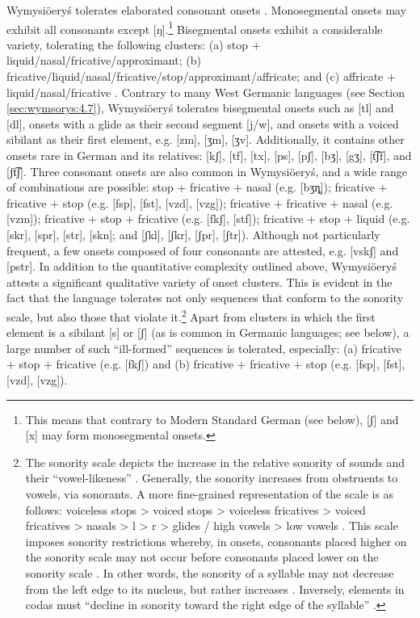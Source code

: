 \documentclass[output=paper,hidelinks]{langscibook}
\begin{document}
Wymysiöeryś tolerates elaborated consonant onsets \citep[71]{andrason_vilamovicean_2015}. Mono\-segmental onsets may exhibit all consonants except [ŋ].\footnote{This means that contrary to Modern Standard German (see below), [ʃ] and [x] may form monosegmental onsets.} Bisegmental onsets exhibit a considerable variety, tolerating the following clusters: (a) stop + liquid/na\-sal/fricative/approximant; (b) fricative/liquid/nasal/fricative/stop{\slash}approximant{\slash}affricate; and (c) affricate + liquid/nasal/fricative \citep{Andrason2021}. Contrary to many West Germanic languages (see Section \ref{sec:wymsorys:4.7}), Wymysiöeryś tolerates bisegmental onsets such as [tl] and [dl], onsets with a glide as their second segment [j/w], and onsets with a voiced sibilant as their first element, e.g. [zm], [ʒm], [ʒv]. Additionally, it contains other onsets rare in German and its relatives: [kʃ], [tf], [tx], [ps], [pʃ], [bʒ], [gʒ], [t͡ʃf], and [ʃt͡ʃ]. Three consonant onsets are also common in Wymysiöeryś, and a wide range of combinations are possible: stop + fricative + nasal (e.g. [bʒȵ]); fricative + fricative + stop (e.g. [fsp], [fst], [vzd], [vzg]); fricative + fricative + nasal (e.g. [vzm]); fricative + stop + fricative (e.g. [fkʃ], [stf]); fricative + stop + liquid (e.g. [skr], [spr], [str], [skn]; and [ʃkl], [ʃkr], [ʃpr], [ʃtr]). Although not particularly frequent, a few onsets composed of four consonants are attested, e.g. [vskʃ] and [pstr]. In addition to the quantitative complexity outlined above, Wymysiöeryś attests a significant qualitative variety of onset clusters. This is evident in the fact that the language tolerates not only sequences that conform to the sonority scale, but also those that violate it.\footnote{The sonority scale depicts the increase in the relative sonority of sounds and their ``vowel-likeness'' \citep{foley_foundations_1977, clements_role_1990}. Generally, the sonority increases from obstruents to vowels, via sonorants. A more fine-grained representation of the scale is as follows: voiceless stops > voiced stops > voiceless fricatives > voiced fricatives > nasals > l > r > glides / high vowels > low vowels \citep[65]{harbert_germanic_2007}. This scale imposes sonority restrictions whereby, in onsets, consonants placed higher on the sonority scale may not occur before consonants placed lower on the sonority scale \citep[66, 68]{harbert_germanic_2007}. In other words, the sonority of a syllable may not decrease from the left edge to its nucleus, but rather increases \citep[66, 68]{harbert_germanic_2007}. Inversely, elements in codas must ``decline in sonority toward the right edge of the syllable'' \citep[73]{harbert_germanic_2007}.} Apart from clusters in which the first element is a sibilant [s] or [ʃ] (as is common in Germanic languages; see below), a large number of such ``ill-formed'' sequences is tolerated, especially: (a) fricative + stop + fricative (e.g. [fkʃ]) and (b) fricative + fricative + stop (e.g. [fsp], [fst], [vzd], [vzg]).
\end{document}
